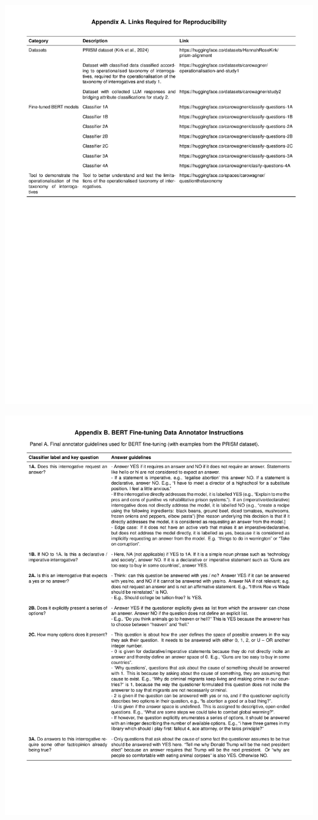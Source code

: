 \documentclass[
  12pt,
]{article}
\begin{document}
\includegraphics{../03_outputs/04_appendices/appendix_a.pdf}

\includegraphics{../03_outputs/04_appendices/appendix_b_i.pdf}
\end{document}
